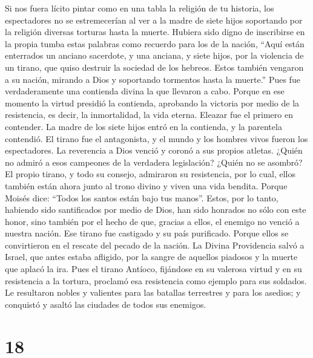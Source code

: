  Si nos fuera lícito pintar como en una tabla la religión
de tu historia, los espectadores no se estremecerían al ver a la madre
de siete hijos soportando por la religión diversas torturas hasta la
muerte.  Hubiera sido digno de inscribirse en la propia
tumba estas palabras como recuerdo para los de la nación, 
``Aquí están enterrados un anciano sacerdote, y una anciana, y siete
hijos, por la violencia de un tirano, que quiso destruir la sociedad de
los hebreos.  Estos también vengaron a su nación, mirando
a Dios y soportando tormentos hasta la muerte.''  Pues
fue verdaderamente una contienda divina la que llevaron a cabo.
 Porque en ese momento la virtud presidió la contienda,
aprobando la victoria por medio de la resistencia, es decir, la
inmortalidad, la vida eterna.  Eleazar fue el primero en
contender. La madre de los siete hijos entró en la contienda, y la
parentela contendió.  El tirano fue el antagonista, y el
mundo y los hombres vivos fueron los espectadores.  La
reverencia a Dios venció y coronó a sus propios atletas. 
¿Quién no admiró a esos campeones de la verdadera legislación? ¿Quién no
se asombró?  El propio tirano, y todo su consejo,
admiraron su resistencia,  por lo cual, ellos también
están ahora junto al trono divino y viven una vida bendita.
 Porque Moisés dice: ``Todos los santos están bajo tus
manos''.  Estos, por lo tanto, habiendo sido santificados
por medio de Dios, han sido honrados no sólo con este honor, sino
también por el hecho de que, gracias a ellos, el enemigo no venció a
nuestra nación.  Ese tirano fue castigado y su país
purificado.  Porque ellos se convirtieron en el rescate
del pecado de la nación. La Divina Providencia salvó a Israel, que antes
estaba afligido, por la sangre de aquellos piadosos y la muerte que
aplacó la ira.  Pues el tirano Antíoco, fijándose en su
valerosa virtud y en su resistencia a la tortura, proclamó esa
resistencia como ejemplo para sus soldados.  Le
resultaron nobles y valientes para las batallas terrestres y para los
asedios; y conquistó y asaltó las ciudades de todos sus enemigos.

\hypertarget{section-17}{%
\section{18}\label{section-17}}

